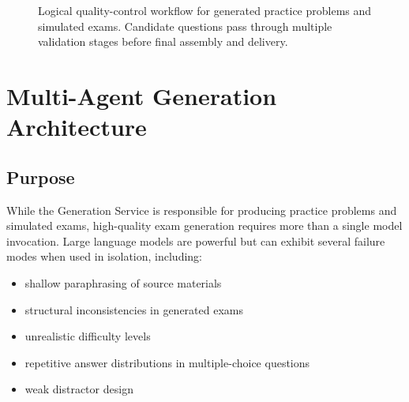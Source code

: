 \documentclass[11pt]{article}
\begin{document}
\begin{figure}[H]
\centering
{}
\caption{Logical quality-control workflow for generated practice problems and simulated exams. Candidate questions pass through multiple validation stages before final assembly and delivery.}
\end{figure}

\section{Multi-Agent Generation Architecture}

\subsection{Purpose}
While the Generation Service is responsible for producing practice problems and simulated exams, high-quality exam generation requires more than a single model invocation. Large language models are powerful but can exhibit several failure modes when used in isolation, including:

\begin{itemize}
\item shallow paraphrasing of source materials
\item structural inconsistencies in generated exams
\item unrealistic difficulty levels
\item repetitive answer distributions in multiple-choice questions
\item weak distractor design
\end{itemize}
\end{document}
